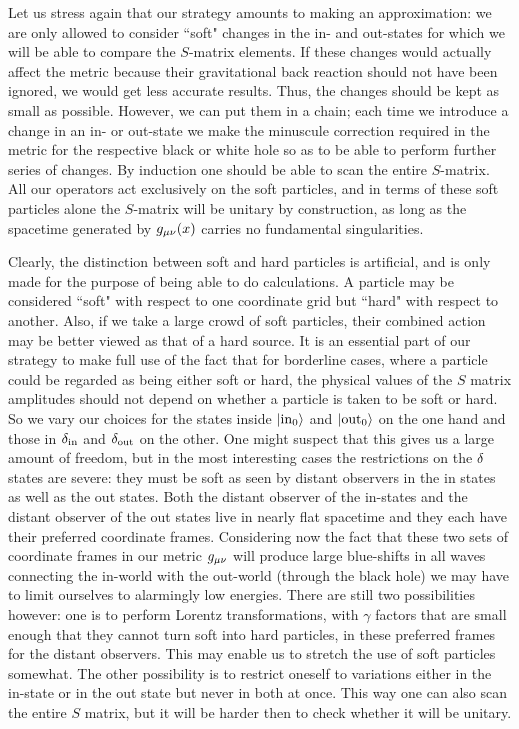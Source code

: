 Let us stress again that our strategy amounts to making an
approximation: we are only allowed to consider ``soft" changes in the
in- and out-states for which we will be able to compare the $S$-matrix
elements. If these changes would actually affect the metric because
their gravitational back reaction should not have been ignored, we
would get less accurate results. Thus, the changes should be kept as
small as possible. However, we can put them in a chain; each time we
introduce a change in an in- or out-state we make the minuscule
correction required in the metric for the respective black or white
hole so as to be able to perform further series of changes. By
induction one should be able to scan the entire $S$-matrix.  All our
operators act exclusively on the soft particles, and in terms of these
soft particles alone the $S$-matrix will be unitary by construction, as
long as the spacetime generated by $g_{\mu\nu}(x)$ carries no fundamental
singularities.

Clearly, the distinction between soft and hard particles is artificial,
and is only made for the purpose of being able to do calculations. A
particle may be considered ``soft" with respect to one coordinate grid
but ``hard" with respect to another. Also, if we take a large crowd of
soft particles, their combined action may be better viewed as that of a
hard source. It is an essential part of our strategy to make full use
of the fact that for borderline cases, where a particle could be
regarded as being either soft or hard, the physical values of the $S$
matrix amplitudes should not depend on whether a particle is taken to
be soft or hard. So we vary our choices for the states inside $|\rm
in_0 \rangle$ and $|\rm out_0\rangle$ on the one hand and those in
$\delta_{\rm in}$ and $\delta_{\rm out}$ on the other. One might suspect that
this gives us a large amount of freedom, but in the most interesting
cases the restrictions on the $\delta$ states are severe: they must be soft
as seen by distant observers in the in states as well as the out
states. Both the distant observer of the in-states and the distant
observer of the out states live in nearly flat spacetime and they each
have their preferred coordinate frames.  Considering now the fact that
these two sets of coordinate frames in our metric $g_{\mu\nu}$ will
produce large blue-shifts in all waves connecting the in-world with the
out-world (through the black hole) we may have to limit ourselves to
alarmingly low energies. There are still two possibilities however: one
is to perform Lorentz transformations, with $\gamma$ factors that are
small enough that they cannot turn soft into hard particles, in these
preferred frames for the distant observers. This may enable us to
stretch the use of soft particles somewhat. The other possibility is to
restrict oneself to variations either in the in-state or in the out
state but never in both at once. This way one can also scan the entire
$S$ matrix, but it will be harder then to check whether it will be
unitary.


